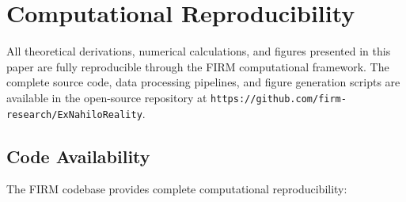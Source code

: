 \documentclass[12pt]{article}
\begin{document}































\section{Computational Reproducibility}

All theoretical derivations, numerical calculations, and figures presented in this paper are fully reproducible through the FIRM computational framework. The complete source code, data processing pipelines, and figure generation scripts are available in the open-source repository at \texttt{https://github.com/firm-research/ExNahiloReality}.

\subsection{Code Availability}

The FIRM codebase provides complete computational reproducibility:
\end{document}
